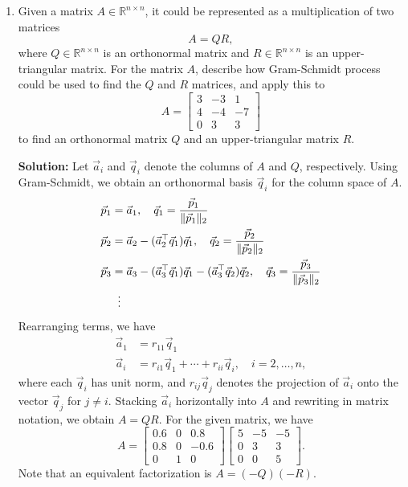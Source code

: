 \documentclass[10pt]{article}
\theoremstyle{definition}
\theoremstyle{plain}
\newcommand{\RR}{\mathbb{R}}
\newcommand{\vv}[1]{\vec{#1}}
\begin{document}
\begin{enumerate}[label=(\alph*)]
\item Given a matrix $A \in \RR^{n \times n}$, it could be represented as a multiplication of two matrices
\begin{equation}
A = QR,
\end{equation}
where $Q \in \RR^{n \times n}$ is an orthonormal matrix and $R \in \RR^{n \times n}$ is an upper-triangular matrix. For the matrix $A$, describe how Gram-Schmidt process could be used to find the $Q$ and $R$ matrices, and apply this to
\begin{equation}
A = \begin{bmatrix} 3 & -3 & 1 \\ 4 & -4 & -7 \\ 0 & 3 & 3 \end{bmatrix}
\end{equation}
to find an orthonormal matrix $Q$ and an upper-triangular matrix $R$.

\textbf{Solution:} Let $\vv{a}_i$ and $\vv{q}_i$ denote the columns of $A$ and $Q$, respectively. Using Gram-Schmidt, we obtain an orthonormal basis $\vv{q}_i$ for the column space of $A$.
\begin{align}
\vv{p}_1 &= \vv{a}_1, \quad \vv{q}_1 = \frac{\vv{p}_1}{\|\vv{p}_1\|_2} \\
\vv{p}_2 &= \vv{a}_2 - (\vv{a}_2^\top \vv{q}_1)\vv{q}_1, \quad \vv{q}_2 = \frac{\vv{p}_2}{\|\vv{p}_2\|_2} \\
\vv{p}_3 &= \vv{a}_3 - (\vv{a}_3^\top \vv{q}_1)\vv{q}_1 - (\vv{a}_3^\top \vv{q}_2)\vv{q}_2, \quad \vv{q}_3 = \frac{\vv{p}_3}{\|\vv{p}_3\|_2} \\
&\;\;\vdots \notag
\end{align}
Rearranging terms, we have
\begin{align}
\vv{a}_1 &= r_{11}\vv{q}_1 \\
\vv{a}_i &= r_{i1}\vv{q}_1 + \cdots + r_{ii}\vv{q}_i, \quad i = 2, \ldots, n,
\end{align}
where each $\vv{q}_i$ has unit norm, and $r_{ij}\vv{q}_j$ denotes the projection of $\vv{a}_i$ onto the vector $\vv{q}_j$ for $j \neq i$. Stacking $\vv{a}_i$ horizontally into $A$ and rewriting in matrix notation, we obtain $A = QR$. For the given matrix, we have
\begin{equation}
A = \begin{bmatrix} 0.6 & 0 & 0.8 \\ 0.8 & 0 & -0.6 \\ 0 & 1 & 0 \end{bmatrix} \begin{bmatrix} 5 & -5 & -5 \\ 0 & 3 & 3 \\ 0 & 0 & 5 \end{bmatrix}.
\end{equation}
Note that an equivalent factorization is $A = (-Q)(-R)$.


\end{enumerate}
\end{document}

